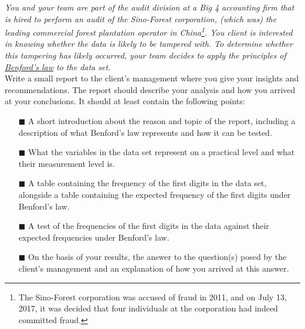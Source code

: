 \textit{You and your team are part of the audit division at a Big 4 accounting firm that is hired to perform an audit of the Sino-Forest corporation, (which was) the leading commercial forest plantation operator in China\footnote{The Sino-Forest corporation was accused of fraud in 2011, and on July 13, 2017, it was decided that four individuals at the corporation had indeed committed fraud.}. You client is interested in knowing whether the data is likely to be tampered with. To determine whether this tampering has likely occurred, your team decides to apply the principles of \href{https://en.wikipedia.org/wiki/Benford\%27s_law}{Benford's law} to the data set.} \\

Write a small report to the client's management where you give your insights and recommendations. The report should describe your analysis and how you arrived at your conclusions. It should at least contain the following points: \\

\begin{itemize}
    \item[$\blacksquare$] A short introduction about the reason and topic of the report, including a description of what Benford's law represents and how it can be tested.
    \item[$\blacksquare$] What the variables in the data set represent on a practical level and what their measurement level is. 
    \item[$\blacksquare$] A table containing the frequency of the first digits in the data set, alongside a table containing the expected frequency of the first digits under Benford's law.
    \item[$\blacksquare$] A test of the frequencies of the first digits in the data against their expected frequencies under Benford's law.
    \item[$\blacksquare$] On the basis of your results, the answer to the question(s) posed by the client's management and an explanation of how you arrived at this answer.
\end{itemize}

\clearpage %